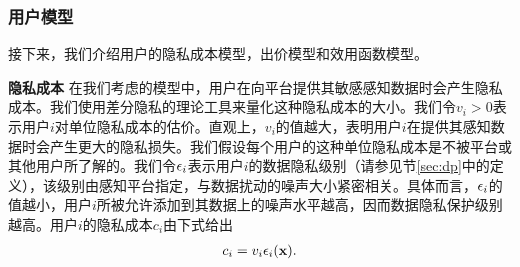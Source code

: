 	\subsubsection{用户模型}\label{sec:wm} 接下来，我们介绍用户的隐私成本模型，出价模型和效用函数模型。
	
	{\bfseries 隐私成本} 在我们考虑的模型中，用户在向平台提供其敏感感知数据时会产生隐私成本。我们使用差分隐私\cite{Dwork}的理论工具来量化这种隐私成本的大小。我们令$v_i>0$表示用户$i$对单位隐私成本的估价。直观上，$v_i$的值越大，表明用户$i$在提供其感知数据时会产生更大的隐私损失。我们假设每个用户的这种单位隐私成本是不被平台或其他用户所了解的。我们令$\epsilon_i$表示用户$i$的数据隐私级别（请参见节\ref{sec:dp}中的定义），该级别由感知平台指定，与数据扰动的噪声大小紧密相关。具体而言，$\epsilon_i$的值越小，用户$i$所被允许添加到其数据上的噪声水平越高，因而数据隐私保护级别越高。用户$i$的隐私成本$c_i$由下式给出
	\begin{equation}\label{eq:privacycost}
	\begin{array}
	[c]{lll}%
	c_i=v_i\e_i(\mathbf{x}).
	\end{array}
	\end{equation} 
